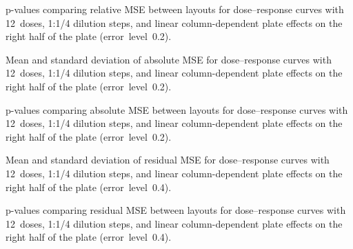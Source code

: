 \begin{table}[p]
    \centering
    \small
    
    \caption{p-values comparing relative \ECIC{} MSE between layouts for dose--response curves with 12~doses, 1:1/4 dilution steps, and linear column-dependent plate effects on the right half of the plate (error~level~0.2).}
    \label{tab:dr-relic50-pvalues-12doses-dil4-half-columns-neg-controls-0.2}
\end{table}

\begin{table}[p]
    \centering
    \small
    
    \caption{Mean and standard deviation of absolute \ECIC{} MSE for dose--response curves with 12~doses, 1:1/4 dilution steps, and linear column-dependent plate effects on the right half of the plate (error~level~0.2).}
    \label{tab:dr-absic50-mean-std-12doses-dil4-half-columns-neg-controls-0.2}
\end{table}

\begin{table}[p]
    \centering
    \small
    
    \caption{p-values comparing absolute \ECIC{} MSE between layouts for dose--response curves with 12~doses, 1:1/4 dilution steps, and linear column-dependent plate effects on the right half of the plate (error~level~0.2).}
    \label{tab:dr-absic50-pvalues-12doses-dil4-half-columns-neg-controls-0.2}
\end{table}

\begin{table}[p]
    \centering
    \small
    
    \caption{Mean and standard deviation of residual MSE for dose--response curves with 12~doses, 1:1/4 dilution steps, and linear column-dependent plate effects on the right half of the plate (error~level~0.4).}
    \label{tab:dr-residuals-mean-std-12doses-dil4-half-columns-neg-controls-0.4}
\end{table}

\clearpage
\begin{table}[p]
    \centering
    \small
    
    \caption{p-values comparing residual MSE between layouts for dose--response curves with 12~doses, 1:1/4 dilution steps, and linear column-dependent plate effects on the right half of the plate (error~level~0.4).}
    \label{tab:dr-residuals-pvalues-12doses-dil4-half-columns-neg-controls-0.4}
\end{table}


